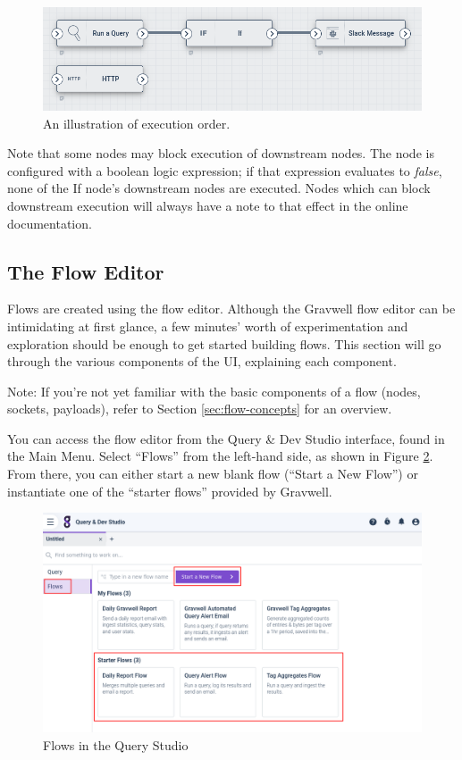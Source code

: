 \begin{figure}
	\includegraphics[width=0.7\linewidth]{images/execution.png}
	\caption{An illustration of execution order.}
	\label{fig:execution}
\end{figure}

Note that some nodes may block execution of downstream nodes. The  node is configured with a boolean logic expression; if that expression evaluates to \emph{false}, none of the If node's downstream nodes are executed. Nodes which can block downstream execution will always have a note to that effect in the online documentation.

\subsection{The Flow Editor}
Flows are created using the flow editor. Although the Gravwell flow editor can be intimidating at first glance, a few minutes' worth of experimentation and exploration should be enough to get started building flows. This section will go through the various components of the UI, explaining each component.

Note: If you're not yet familiar with the basic components of a flow (nodes, sockets, payloads), refer to Section \ref{sec:flow-concepts} for an overview.

You can access the flow editor from the Query \& Dev Studio interface, found in the Main Menu. Select ``Flows'' from the left-hand side, as shown in Figure \ref{fig:dev-studio-newflow}. From there, you can either start a new blank flow (``Start a New Flow'') or instantiate one of the ``starter flows'' provided by Gravwell.

\begin{figure}
	\includegraphics[width=0.8\linewidth]{images/dev-studio-newflow.png}
	\caption{Flows in the Query Studio}
	\label{fig:dev-studio-newflow}
\end{figure}

